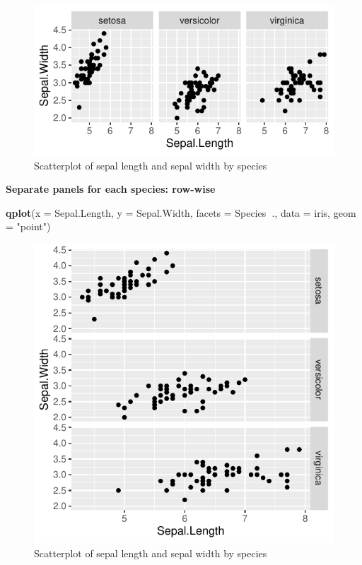 \documentclass[]{article}
\newenvironment{Shaded}{\begin{snugshade}}{\end{snugshade}}
\newcommand{\DataTypeTok}[1]{\textcolor[rgb]{0.13,0.29,0.53}{#1}}
\newcommand{\KeywordTok}[1]{\textcolor[rgb]{0.13,0.29,0.53}{\textbf{#1}}}
\newcommand{\NormalTok}[1]{#1}
\newcommand{\OperatorTok}[1]{\textcolor[rgb]{0.81,0.36,0.00}{\textbf{#1}}}
\newcommand{\StringTok}[1]{\textcolor[rgb]{0.31,0.60,0.02}{#1}}
\begin{document}
\begin{figure}
\centering
\includegraphics{Week3Answers_files/figure-latex/unnamed-chunk-16-1.pdf}
\caption{Scatterplot of sepal length and sepal width by species}
\end{figure}

\newpage

\textbf{Separate panels for each species: row-wise}

\begin{Shaded}
\begin{Highlighting}[]
\KeywordTok{qplot}\NormalTok{(}\DataTypeTok{x =}\NormalTok{ Sepal.Length, }\DataTypeTok{y =}\NormalTok{ Sepal.Width, }
      \DataTypeTok{facets =}\NormalTok{ Species}\OperatorTok{~}\NormalTok{., }\DataTypeTok{data =}\NormalTok{ iris, }\DataTypeTok{geom =} \StringTok{"point"}\NormalTok{)}
\end{Highlighting}
\end{Shaded}

\begin{figure}
\centering
\includegraphics{Week3Answers_files/figure-latex/unnamed-chunk-17-1.pdf}
\caption{Scatterplot of sepal length and sepal width by species}
\end{figure}
\end{document}
